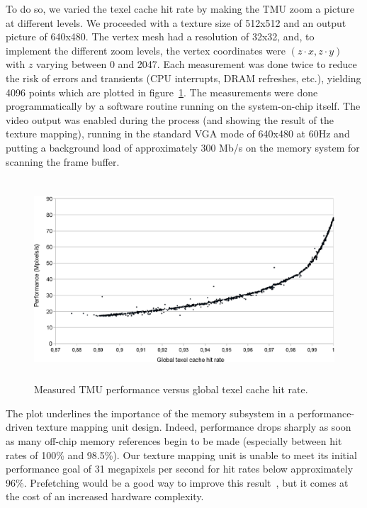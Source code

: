 \documentclass[a4paper,11pt]{kthesis}
\begin{document}
To do so, we varied the texel cache hit rate by making the TMU zoom a picture at different levels. We proceeded with a texture size of 512x512 and an output picture of 640x480. The vertex mesh had a resolution of 32x32, and, to implement the different zoom levels, the vertex coordinates were $(z \cdot x, z \cdot y)$ with $z$ varying between 0 and 2047. Each measurement was done twice to reduce the risk of errors and transients (CPU interrupts, DRAM refreshes, etc.), yielding 4096 points which are plotted in figure~\ref{fig:tmuresult}. The measurements were done programmatically by a software routine running on the system-on-chip itself. The video output was enabled during the process (and showing the result of the texture mapping), running in the standard VGA mode of 640x480 at 60Hz and putting a background load of approximately 300 Mb/s on the memory system for scanning the frame buffer.

\begin{figure}[htp]
\centering
\includegraphics[height=75mm]{tmuresult.eps}
\caption{Measured TMU performance versus global texel cache hit rate.}
\label{fig:tmuresult}
\end{figure}

The plot underlines the importance of the memory subsystem in a performance-driven texture mapping unit design. Indeed, performance drops sharply as soon as many off-chip memory references begin to be made (especially between hit rates of 100\% and 98.5\%). Our texture mapping unit is unable to meet its initial performance goal of 31 megapixels per second for hit rates below approximately 96\%. Prefetching would be a good way to improve this result~\cite{tmprefetch}, but it comes at the cost of an increased hardware complexity.
\end{document}
